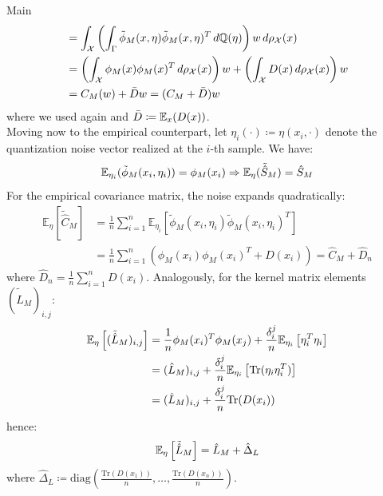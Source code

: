 \begin{chapter}{Main}
\begin{align*}
                               & = \int_{\mathcal{X}} \left( \int_{\Gamma} \tilde{\phi}_M(x, \eta) \tilde{\phi}_M(x, \eta)^T \, d\mathbb{Q}(\eta) \right) w \, d\rho_{\mathcal{X}}(x)                  \\
                               & = \left( \int_{\mathcal{X}} \phi_M(x) \phi_M(x)^T \, d\rho_{\mathcal{X}}(x) \right) w + \left( \int_{\mathcal{X}} D(x) \, d\rho_{\mathcal{X}}(x) \right) w    \\
                               & = C_M (w) + \bar{D} w = (C_M + \bar{D}) w
 \end{align*}
 where we used again \cite{LowPrecisionRFF} and $\bar{D} \coloneqq \mathbb{E}_x(D(x))$.
 \\ Moving now to the empirical counterpart, let $\eta_i(\cdot) \coloneqq \eta(x_i, \cdot)$ denote the quantization noise vector realized at the $i$-th sample. We have:
 $$
     \mathbb{E}_{\eta_i}(\tilde{\phi}_M(x_i, \eta_i)) = \phi_M(x_i) \Rightarrow \mathbb{E}_\eta(\tilde{\hat{S}}_M) = \hat{S}_M
 $$
 For the empirical covariance matrix, the noise expands quadratically:
 \begin{align*}
     \mathbb{E}_\eta[\tilde{\hat{C}}_M] & = \frac{1}{n} \sum_{i=1}^n \mathbb{E}_{\eta_i}\left[ \tilde{\phi}_M(x_i, \eta_i) \tilde{\phi}_M(x_i, \eta_i)^T \right] \\
                                        & = \frac{1}{n} \sum_{i=1}^n \left( \phi_M(x_i)\phi_M(x_i)^T + D(x_i) \right) = \hat{C}_M + \hat{D}_n
 \end{align*}
 where $\hat{D}_n = \frac{1}{n}\sum_{i=1}^n D(x_i)$. Analogously, for the kernel matrix elements $(\tilde{\hat{L}}_M)_{i,j}$:
 \begin{align*}
     \mathbb{E}_\eta\left[(\tilde{\hat{L}}_M)_{i,j}\right] & = \frac{1}{n} \phi_M(x_i)^T \phi_M(x_j) + \frac{\delta_i^j}{n}\mathbb{E}_{\eta_i}\left[\eta_i^T\eta_i\right] \\
                                                   & =(\hat{L}_M)_{i,j}+\frac{\delta_i^j}{n}\mathbb{E}_{\eta_i}\left[\text{Tr}(\eta_i\eta_i^T)\right]             \\
                                                   & =(\hat{L}_M)_{i,j}+\frac{\delta_i^j}{n}\text{Tr}(D(x_i))                                             \\
 \end{align*}
 hence:
 $$
     \mathbb{E}_\eta\left[\tilde{\hat{L}}_M\right] = \hat{L}_M + \hat{\Delta}_L
 $$
 where $\hat{\Delta}_L \coloneqq \text{diag}\left(\frac{\text{Tr}(D(x_1))}{n}, \dots, \frac{\text{Tr}(D(x_n))}{n}\right)$.


\end{chapter}
